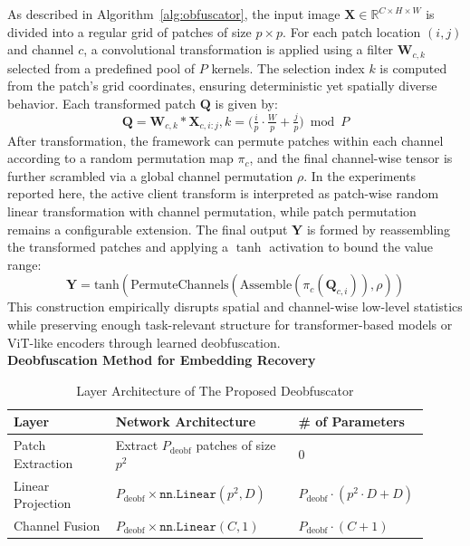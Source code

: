 \documentclass{ieeeaccess}
\newcommand{\rev}[1]{{\color{black}#1}}
\begin{document}
As described in Algorithm~\ref{alg:obfuscator}, the input image $\mathbf{X} \in \mathbb{R}^{C \times H \times W}$ is divided into a regular grid of patches of size $p \times p$. For each patch location $(i,j)$ and channel $c$, a convolutional transformation is applied using a filter $\mathbf{W}_{c,k}$ selected from a predefined pool of $P$ kernels. The selection index $k$ is computed from the patch's grid coordinates, ensuring deterministic yet spatially diverse behavior. Each transformed patch $\mathbf{Q}$ is given by:
\begin{equation}
    \mathbf{Q} = \mathbf{W}_{c,k}\ast\mathbf{X}_{c,i:j},k = \bigl(\tfrac{i}{p}\cdot\tfrac{W}{p}+\tfrac{j}{p}\bigr)\bmod P
\end{equation}
\rev{After transformation, the framework can permute patches within each channel according to a random permutation map $\pi_c$, and the final channel-wise tensor is further scrambled via a global channel permutation $\rho$. In the experiments reported here, the active client transform is interpreted as patch-wise random linear transformation with channel permutation, while patch permutation remains a configurable extension. The final output $\mathbf{Y}$ is formed by reassembling the transformed patches and applying a $\tanh$ activation to bound the value range:}
\begin{equation}
    \mathbf{Y} = \text{tanh}(\text{PermuteChannels}(\text{Assemble}(\pi_c(\mathbf{Q}_{c,i})), \rho))
\end{equation}
\rev{This construction empirically disrupts spatial and channel-wise low-level statistics while preserving enough task-relevant structure for transformer-based models or ViT-like encoders through learned deobfuscation.} \\

\noindent\textbf{Deobfuscation Method for Embedding Recovery}

\begin{table}[t]
\centering
\caption{Layer Architecture of The Proposed Deobfuscator}
\label{tab:deobf-symbolic}
\begin{tabular}{p{0.24\linewidth} p{0.43\linewidth} p{0.24\linewidth}}
\toprule
\textbf{Layer} & \textbf{Network Architecture} & \textbf{\# of Parameters} \\
\midrule
Patch Extraction &
Extract $P_{\text{deobf}}$ patches of size $p^2$ &
$0$ \\

Linear Projection &
$P_{\text{deobf}} \times \texttt{nn.Linear}(p^2, D)$ &
$P_{\text{deobf}} \cdot (p^2 \cdot D + D)$ \\

Channel Fusion &
$P_{\text{deobf}} \times \texttt{nn.Linear}(C, 1)$ &
$P_{\text{deobf}} \cdot (C + 1)$ \\
\bottomrule
\end{tabular}
\end{table}
\end{document}
